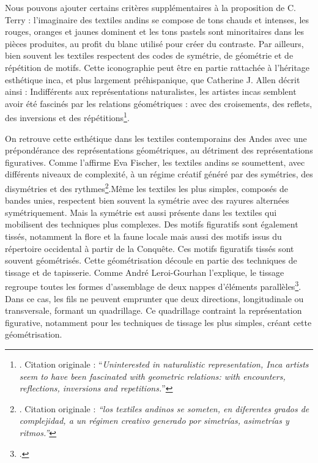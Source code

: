 Nous pouvons ajouter certains critères supplémentaires à la proposition de C. Terry : l'imaginaire des textiles andins se compose de tons chauds et intenses, les rouges, oranges et jaunes dominent et les tons pastels sont minoritaires dans les pièces produites, au profit du blanc utilisé pour créer du contraste. Par ailleurs, bien souvent les textiles respectent des codes de symétrie, de géométrie et de répétition de motifs. Cette iconographie peut être en partie rattachée à l'héritage esthétique inca, et plus largement préhispanique, que Catherine J. Allen décrit ainsi : \og Indifférents aux représentations naturalistes, les artistes incas semblent avoir été fascinés par les relations géométriques : avec des croisements, des reflets, des inversions et des répétitions\footnote{\cite[p.~19]{allenWhenUtensilsRevolt1998}. Citation originale : \textquotedblleft \textit{Uninterested in naturalistic representation, Inca artists seem to have been fascinated with geometric relations: with encounters, reflections, inversions and repetitions.}\textquotedblright}.\fg

On retrouve cette esthétique dans les textiles contemporains des Andes avec une prépondérance des représentations géométriques, au détriment des représentations figuratives. Comme l'affirme Eva Fischer, \og les textiles andins se soumettent, avec différents niveaux de complexité, à un régime créatif généré par des symétries, des disymétries et des rythmes\footnote{\cite[p.~226]{fischerUrdiendoTejidoSocial2008}. Citation originale : \textit{\textquotedblleft los textiles andinos se someten, en diferentes grados de complejidad, a un régimen creativo generado por simetrías, asimetrías y ritmos.\textquotedblright}}.\fg \:Même les textiles les plus simples, composés de bandes unies, respectent bien souvent la symétrie avec des rayures alternées symétriquement. Mais la symétrie est aussi présente dans les textiles qui mobilisent des techniques plus complexes. Des motifs figuratifs sont également tissés, notamment la flore et la faune locale mais aussi des motifs issus du répertoire occidental à partir de la Conquête. Ces motifs figuratifs tissés sont souvent géométrisés. Cette géométrisation découle en partie des techniques de tissage et de tapisserie. Comme André Leroi-Gourhan l'explique, le tissage regroupe \og toutes les formes d'assemblage de deux nappes d'éléments parallèles\fg\footcite[p.~81]{leroi-gourhanHommeMatiereEvolution1943}. Dans ce cas, les fils ne peuvent emprunter que deux directions, longitudinale ou transversale, formant un quadrillage. Ce quadrillage contraint la représentation figurative, notamment pour les techniques de tissage les plus simples, créant cette géométrisation. 

